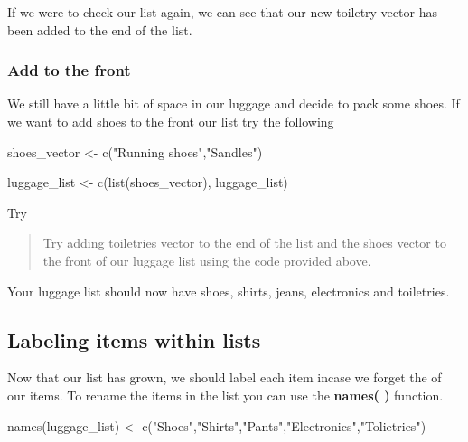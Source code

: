 \documentclass[
]{book}
\newenvironment{Shaded}{\begin{snugshade}}{\end{snugshade}}
\newcommand{\FunctionTok}[1]{\textcolor[rgb]{0.00,0.00,0.00}{#1}}
\newcommand{\NormalTok}[1]{#1}
\newcommand{\OtherTok}[1]{\textcolor[rgb]{0.56,0.35,0.01}{#1}}
\newcommand{\StringTok}[1]{\textcolor[rgb]{0.31,0.60,0.02}{#1}}
\begin{document}
If we were to check our list again, we can see that our new toiletry vector has been added to the end of the list.

\hypertarget{add-to-the-front}{%
\subsubsection{Add to the front}\label{add-to-the-front}}

We still have a little bit of space in our luggage and decide to pack some shoes. If we want to add shoes to the front our list try the following

\begin{Shaded}
\begin{Highlighting}[]
\NormalTok{shoes\_vector }\OtherTok{\textless{}{-}} \FunctionTok{c}\NormalTok{(}\StringTok{"Running shoes"}\NormalTok{,}\StringTok{"Sandles"}\NormalTok{)}

\NormalTok{luggage\_list }\OtherTok{\textless{}{-}} \FunctionTok{c}\NormalTok{(}\FunctionTok{list}\NormalTok{(shoes\_vector), luggage\_list)}
\end{Highlighting}
\end{Shaded}

Try

\begin{quote}
Try adding toiletries vector to the end of the list and the shoes vector to the front of our luggage list using the code provided above.
\end{quote}

Your luggage list should now have shoes, shirts, jeans, electronics and toiletries.

\hypertarget{labeling-items-within-lists}{%
\subsection{Labeling items within lists}\label{labeling-items-within-lists}}

Now that our list has grown, we should label each item incase we forget the of our items. To rename the items in the list you can use the \textbf{names( )} function.

\begin{Shaded}
\begin{Highlighting}[]
\FunctionTok{names}\NormalTok{(luggage\_list) }\OtherTok{\textless{}{-}} \FunctionTok{c}\NormalTok{(}\StringTok{"Shoes"}\NormalTok{,}\StringTok{"Shirts"}\NormalTok{,}\StringTok{"Pants"}\NormalTok{,}\StringTok{"Electronics"}\NormalTok{,}\StringTok{"Tolietries"}\NormalTok{)}
\end{Highlighting}
\end{Shaded}
\end{document}
